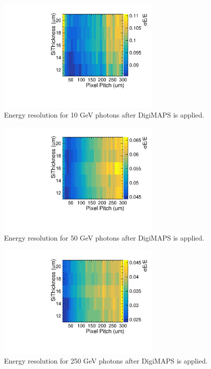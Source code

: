 \begin{figure}
  \centering
  \includegraphics[width=0.7\textwidth,keepaspectratio]{DECALStudies/fig/FullDigiRes10.pdf}
  \caption{Energy resolution for 10 GeV photons after DigiMAPS is applied.}
  \label{fig:resolution10Digi}
\end{figure}

\begin{figure}
  \centering
  \includegraphics[width=0.7\textwidth,keepaspectratio]{DECALStudies/fig/FullDigiRes50.pdf}
  \caption{Energy resolution for 50 GeV photons after DigiMAPS is applied.}
  \label{fig:resolution50Digi}
\end{figure}

\begin{figure}
  \centering
  \includegraphics[width=0.7\textwidth,keepaspectratio]{DECALStudies/fig/FullDigiRes250.pdf}
  \caption{Energy resolution for 250 GeV photons after DigiMAPS is applied.}
  \label{fig:resolution250Digi}
\end{figure}

